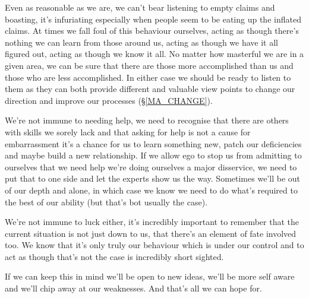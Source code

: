 \cleartorightpage
{\small

Even as reasonable as we are, we can't bear listening to empty claims and boasting, it's infuriating especially when people seem to be eating up the inflated claims. At times we fall foul of this behaviour ourselves, acting as though there's nothing we can learn from those around us, acting as though we have it all figured out, acting as though we know it all. No matter how masterful we are in a given area, we can be sure that there are those more accomplished than us and those who are less accomplished. In either case we should be ready to listen to them as they can both provide different and valuable view points to change our direction and improve our processes (\S \ref{MA_CHANGE}).

We're not immune to needing help, we need to recognise that there are others with skills we sorely lack and that asking for help is not a cause for embarrassment it's a chance for us to learn something new, patch our deficiencies and maybe build a new relationship. If we allow ego to stop us from admitting to ourselves that we need help we're doing ourselves a major disservice, we need to put that to one side and let the experts show us the way. Sometimes we'll be out of our depth and alone, in which case we know we need to do what's required to the best of our ability (but that's bot usually the case).

We're not immune to luck either, it's incredibly important to remember that the current situation is not just down to us, that there's an element of fate involved too. We know that it's only truly our behaviour which is under our control and to act as though that's not the case is incredibly short sighted.

If we can keep this in mind we'll be open to new ideas, we'll be more self aware and we'll chip away at our weaknesses. And that's all we can hope for.

}
\cleartoleftpage
